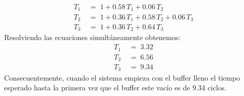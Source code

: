 \documentclass[ a4paper, twoside, 11pt]{article}
\begin{document}
\begin{problem}
\begin{enumerate}[label=\textbf{\alph*)}]
\begin{align*}
T_1 \; & = \; 1 + 0.58 \, T_1 + 0.06 \, T_2 \\
T_2 \; & = \; 1 + 0.36 \, T_1 + 0.58 \, T_2 + 0.06 \, T_3 \\
T_3 \; & = \; 1 + 0.36 \, T_2 + 0.64 \, T_3
\end{align*}
Resolviendo las ecuaciones simult\'aneamente obtenemos: 
\begin{align*}
T_1 \; & = \; 3.32 \\
T_2 \; & = \; 6.56 \\
T_3 \; & = \; 9.34
\end{align*}
Consecuentemente, cuando el sistema empieza con el buffer lleno el tiempo esperado hasta la primera vez que el buffer este vac\'io es de 9.34 ciclos. 

\end{enumerate}

\end{problem}
\fullskip
\end{document}
